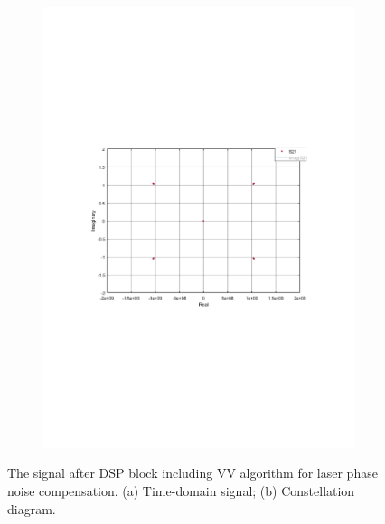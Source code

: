 \begin{refsection}
\begin{figure}[h!]
\begin{subfigure}{.5\textwidth}
  \includegraphics[width=\linewidth]{./sdf/dsp_laser_phase_compensation/figures/S24_constl_v2.pdf}
  \caption{}
  \label{fig:sub2}
\end{subfigure}
\caption{The signal after DSP block including VV algorithm for laser phase noise compensation. (a) Time-domain signal; (b)  Constellation diagram.}
\label{fig_s24}
\end{figure}


\end{refsection}
